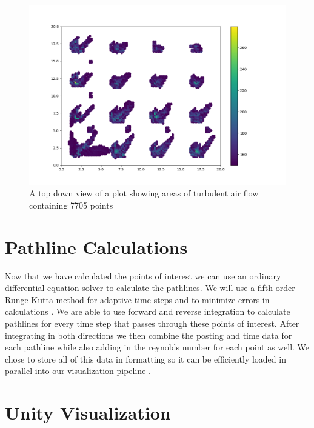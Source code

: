 \begin{figure}
\centering
\includegraphics[scale=.35]{Figures/Turb2D_4_11.png}
\decoRule
\caption[Turbulent Air Flow Scatter Plot]{A top down view of a plot showing areas of turbulent air flow containing 7705 points}
\label{fig:MTurbulentflow}
\end{figure}
\section{Pathline Calculations}

Now that we have calculated the points of interest we can use an ordinary differential equation solver to calculate the pathlines. We will use a fifth-order Runge-Kutta method for adaptive time steps and to minimize errors in calculations \cite{Teitzel1997}. We are able to use forward and reverse integration to calculate pathlines for every time step that passes through these points of interest. After integrating in both directions we then combine the posting and time data for each pathline while also adding in the reynolds number for each point as well. We chose to store all of this data in  formatting so it can be efficiently loaded in parallel into our visualization pipeline \cite{}.

\section{Unity Visualization}

